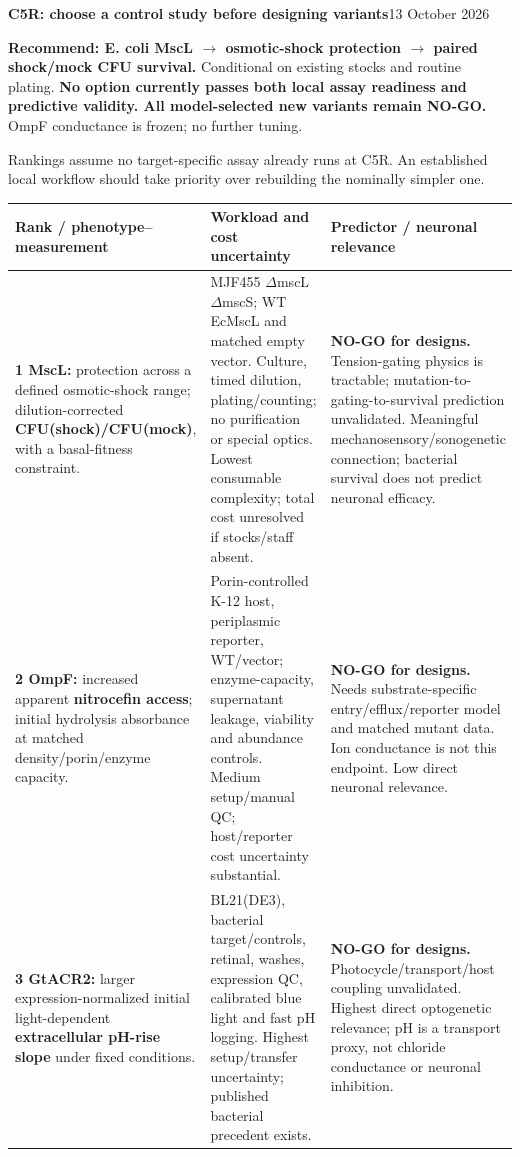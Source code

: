 \documentclass[10pt]{article}
\begin{document}
{\LARGE\bfseries C5R: choose a control study before designing variants}\hfill 13 October 2026

\textbf{Recommend: E. coli MscL $\rightarrow$ osmotic-shock protection $\rightarrow$ paired shock/mock CFU survival.}
Conditional on existing stocks and routine plating. \textbf{No option currently passes both local assay readiness and predictive validity. All model-selected new variants remain NO-GO.} OmpF conductance is frozen; no further tuning.

Rankings assume no target-specific assay already runs at C5R. An established local workflow should take priority over rebuilding the nominally simpler one.

\small
\begin{tabularx}{\linewidth}{@{}>{\raggedright\arraybackslash}p{2.25in}YY@{}}
\toprule
{}\textbf{Rank / phenotype--measurement} & \textbf{Workload and cost uncertainty} & \textbf{Predictor / neuronal relevance}\\
\midrule
\textbf{1 MscL:} protection across a defined osmotic-shock range; dilution-corrected \textbf{CFU(shock)/CFU(mock)}, with a basal-fitness constraint.
& MJF455 $\Delta$mscL $\Delta$mscS; WT EcMscL and matched empty vector. Culture, timed dilution, plating/counting; no purification or special optics. Lowest consumable complexity; total cost unresolved if stocks/staff absent.
& \textbf{NO-GO for designs.} Tension-gating physics is tractable; mutation-to-gating-to-survival prediction unvalidated. Meaningful mechanosensory/sonogenetic connection; bacterial survival does not predict neuronal efficacy.\\
\textbf{2 OmpF:} increased apparent \textbf{nitrocefin access}; initial hydrolysis absorbance at matched density/porin/enzyme capacity.
& Porin-controlled K-12 host, periplasmic reporter, WT/vector; enzyme-capacity, supernatant leakage, viability and abundance controls. Medium setup/manual QC; host/reporter cost uncertainty substantial.
& \textbf{NO-GO for designs.} Needs substrate-specific entry/efflux/reporter model and matched mutant data. Ion conductance is not this endpoint. Low direct neuronal relevance.\\
\textbf{3 GtACR2:} larger expression-normalized initial light-dependent \textbf{extracellular pH-rise slope} under fixed conditions.
& BL21(DE3), bacterial target/controls, retinal, washes, expression QC, calibrated blue light and fast pH logging. Highest setup/transfer uncertainty; published bacterial precedent exists.
& \textbf{NO-GO for designs.} Photocycle/transport/host coupling unvalidated. Highest direct optogenetic relevance; pH is a transport proxy, not chloride conductance or neuronal inhibition.\\
\bottomrule
\end{tabularx}
\end{document}
